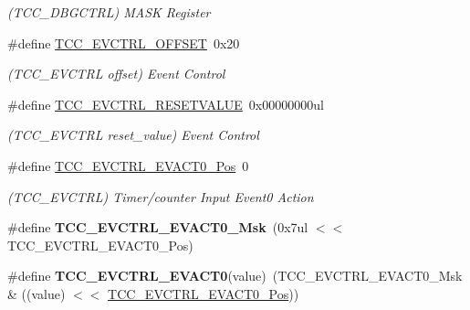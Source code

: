 \begin{DoxyCompactItemize}
\begin{DoxyCompactList}\small\item\em (T\+C\+C\+\_\+\+D\+B\+G\+C\+T\+R\+L) M\+A\+S\+K Register \end{DoxyCompactList}\item 
\hypertarget{group___s_a_m_l21___t_c_c_ga30c14bbb92698aab05b729a7644af7b8}{}\#define \hyperlink{group___s_a_m_l21___t_c_c_ga30c14bbb92698aab05b729a7644af7b8}{T\+C\+C\+\_\+\+E\+V\+C\+T\+R\+L\+\_\+\+O\+F\+F\+S\+E\+T}~0x20\label{group___s_a_m_l21___t_c_c_ga30c14bbb92698aab05b729a7644af7b8}

\begin{DoxyCompactList}\small\item\em (T\+C\+C\+\_\+\+E\+V\+C\+T\+R\+L offset) Event Control \end{DoxyCompactList}\item 
\hypertarget{group___s_a_m_l21___t_c_c_ga502d3a4e97d058043bec413c080708e9}{}\#define \hyperlink{group___s_a_m_l21___t_c_c_ga502d3a4e97d058043bec413c080708e9}{T\+C\+C\+\_\+\+E\+V\+C\+T\+R\+L\+\_\+\+R\+E\+S\+E\+T\+V\+A\+L\+U\+E}~0x00000000ul\label{group___s_a_m_l21___t_c_c_ga502d3a4e97d058043bec413c080708e9}

\begin{DoxyCompactList}\small\item\em (T\+C\+C\+\_\+\+E\+V\+C\+T\+R\+L reset\+\_\+value) Event Control \end{DoxyCompactList}\item 
\hypertarget{group___s_a_m_l21___t_c_c_gaa3e2449eae58d3ef88f4cf52816c4c20}{}\#define \hyperlink{group___s_a_m_l21___t_c_c_gaa3e2449eae58d3ef88f4cf52816c4c20}{T\+C\+C\+\_\+\+E\+V\+C\+T\+R\+L\+\_\+\+E\+V\+A\+C\+T0\+\_\+\+Pos}~0\label{group___s_a_m_l21___t_c_c_gaa3e2449eae58d3ef88f4cf52816c4c20}

\begin{DoxyCompactList}\small\item\em (T\+C\+C\+\_\+\+E\+V\+C\+T\+R\+L) Timer/counter Input Event0 Action \end{DoxyCompactList}\item 
\hypertarget{group___s_a_m_l21___t_c_c_ga3114f3a21655c267b029768a643d75de}{}\#define {\bfseries T\+C\+C\+\_\+\+E\+V\+C\+T\+R\+L\+\_\+\+E\+V\+A\+C\+T0\+\_\+\+Msk}~(0x7ul $<$$<$ T\+C\+C\+\_\+\+E\+V\+C\+T\+R\+L\+\_\+\+E\+V\+A\+C\+T0\+\_\+\+Pos)\label{group___s_a_m_l21___t_c_c_ga3114f3a21655c267b029768a643d75de}

\item 
\hypertarget{group___s_a_m_l21___t_c_c_gaae063434c1228ef27194cf731e66c012}{}\#define {\bfseries T\+C\+C\+\_\+\+E\+V\+C\+T\+R\+L\+\_\+\+E\+V\+A\+C\+T0}(value)~(T\+C\+C\+\_\+\+E\+V\+C\+T\+R\+L\+\_\+\+E\+V\+A\+C\+T0\+\_\+\+Msk \& ((value) $<$$<$ \hyperlink{group___s_a_m_l21___t_c_c_gaa3e2449eae58d3ef88f4cf52816c4c20}{T\+C\+C\+\_\+\+E\+V\+C\+T\+R\+L\+\_\+\+E\+V\+A\+C\+T0\+\_\+\+Pos}))\label{group___s_a_m_l21___t_c_c_gaae063434c1228ef27194cf731e66c012}


\end{DoxyCompactItemize}
